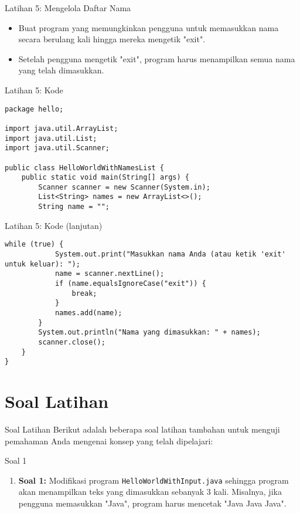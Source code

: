 \documentclass[aspectratio=169, table]{beamer}
\begin{document}
\begin{frame}[fragile]{Latihan 5: Mengelola Daftar Nama}
\begin{itemize}
\item Buat program yang memungkinkan pengguna untuk memasukkan nama secara berulang kali hingga mereka mengetik "exit".
\item Setelah pengguna mengetik "exit", program harus menampilkan semua nama yang telah dimasukkan.
\end{itemize}
\end{frame}

\begin{frame}[fragile]{Latihan 5: Kode}
\begin{lstlisting}[style=JavaStyle]
package hello;

import java.util.ArrayList;
import java.util.List;
import java.util.Scanner;

public class HelloWorldWithNamesList {
	public static void main(String[] args) {
		Scanner scanner = new Scanner(System.in);
		List<String> names = new ArrayList<>();
		String name = "";
\end{lstlisting}
\end{frame}

\begin{frame}[fragile]{Latihan 5: Kode (lanjutan)}
\begin{lstlisting}[style=JavaStyle, firstnumber=12]
		while (true) {
			System.out.print("Masukkan nama Anda (atau ketik 'exit' untuk keluar): ");
			name = scanner.nextLine();
			if (name.equalsIgnoreCase("exit")) {
				break;
			}	
			names.add(name);
		}
		System.out.println("Nama yang dimasukkan: " + names);
		scanner.close();
	}
}
\end{lstlisting}
\end{frame}

\section{Soal Latihan}

\begin{frame}{Soal Latihan}
	Berikut adalah beberapa soal latihan tambahan untuk menguji pemahaman Anda mengenai konsep yang telah dipelajari:
\end{frame}

\begin{frame}{Soal 1}
	\begin{enumerate}
		\item \textbf{Soal 1:} Modifikasi program \texttt{HelloWorldWithInput.java} sehingga program akan menampilkan teks yang dimasukkan sebanyak 3 kali. Misalnya, jika pengguna memasukkan "Java", program harus mencetak "Java Java Java".
	\end{enumerate}
\end{frame}
\end{document}
